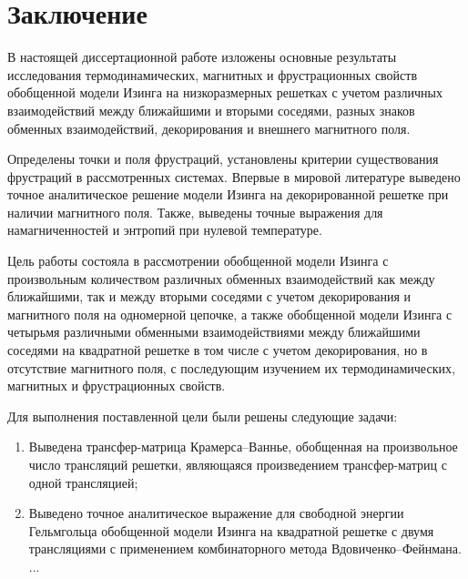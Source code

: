\chapter*{Заключение}                       %


В настоящей диссертационной работе изложены основные результаты исследования термодинамических, магнитных и фрустрационных свойств обобщенной модели Изинга на низкоразмерных решетках с учетом различных взаимодействий между ближайшими и вторыми соседями, разных знаков обменных взаимодействий, декорирования и внешнего магнитного поля.

Определены точки и поля фрустраций, установлены критерии существования фрустраций в рассмотренных системах. Впервые в мировой литературе выведено точное аналитическое решение модели Изинга на  декорированной решетке при наличии магнитного поля. Также, выведены точные выражения для намагниченностей и энтропий при нулевой температуре.

Цель работы состояла в рассмотрении обобщенной модели Изинга с произвольным количеством различных обменных взаимодействий как между ближайшими, так и между вторыми соседями с учетом декорирования и магнитного поля на одномерной цепочке, а также обобщенной модели Изинга с четырьмя различными обменными взаимодействиями между ближайшими соседями на квадратной решетке в том числе с учетом декорирования, но в отсутствие магнитного поля, с последующим изучением их термодинамических, магнитных и фрустрационных свойств.

Для выполнения поставленной цели были решены следующие задачи:
\begin{enumerate}
  	\item Выведена трансфер-матрица Крамерса--Ваннье, обобщенная на произвольное число трансляций решетки, являющаяся произведением трансфер-матриц с одной трансляцией;
	\item Выведено точное аналитическое выражение для свободной энергии Гельмгольца обобщенной модели Изинга на квадратной решетке с двумя трансляциями с применением комбинаторного метода Вдовиченко--Фейнмана.
	...
\end{enumerate}

